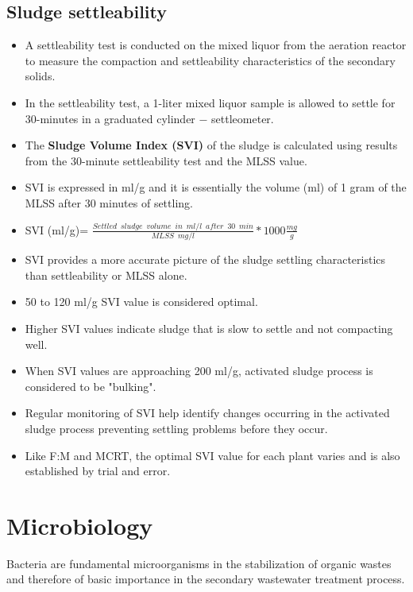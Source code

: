 \subsection{Sludge settleability}
\vspace{5mm}
\begin{itemize}
\item A settleability test is conducted on the mixed liquor from the aeration reactor to  measure the compaction and settleability characteristics of the secondary solids.
\item In the settleability test, a 1-liter mixed liquor sample is allowed to settle for 30-minutes in a graduated cylinder $-$ settleometer. 
\item The \textbf{Sludge Volume Index (SVI)} of the sludge is calculated using results from the 30-minute settleability test and the MLSS value.
\item SVI is expressed in ml/g and it is essentially the volume (ml) of 1 gram of the MLSS after 30 minutes of settling.
\item SVI (ml/g)= $\frac{Settled \enspace sludge \enspace volume \enspace in \enspace ml/l \enspace after \enspace 30 \enspace min}{MLSS \enspace mg/l}*1000 \frac{mg}{g}$
\item SVI provides a more accurate picture of the sludge settling characteristics than settleability or MLSS alone.
\item 50 to 120 ml/g SVI value is considered optimal.
\item Higher SVI values  indicate sludge that is slow to settle and not compacting well.
\item When SVI values are approaching 200 ml/g, activated sludge process is considered to be "bulking".
\item Regular monitoring of SVI help identify changes occurring in the activated sludge process preventing settling problems before they occur.
\item Like F:M and MCRT, the optimal SVI value for each plant varies and is also established by trial and error.
\end{itemize}


		
				
		\section{Microbiology}
		
Bacteria are fundamental microorganisms in the stabilization of organic wastes and therefore of basic importance in the secondary wastewater treatment process.  

